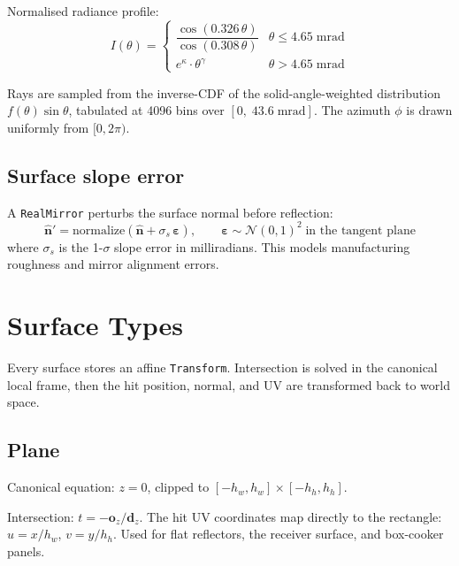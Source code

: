 \documentclass[12pt,a4paper]{report}
\begin{document}
Normalised radiance profile:
\begin{equation}
  I(\theta) = \begin{cases}
    \dfrac{\cos(0.326\,\theta)}{\cos(0.308\,\theta)} & \theta \leq 4.65\;\text{mrad} \\[8pt]
    e^\kappa \cdot \theta^\gamma & \theta > 4.65\;\text{mrad}
  \end{cases}
\end{equation}

Rays are sampled from the inverse-CDF of the solid-angle-weighted distribution
$f(\theta)\sin\theta$, tabulated at 4096 bins over $[0,\;43.6\;\text{mrad}]$.  The azimuth
$\phi$ is drawn uniformly from $[0, 2\pi)$.

\section{Surface slope error}

A \texttt{RealMirror} perturbs the surface normal before reflection:
\begin{equation}
  \hat{\mathbf{n}}' = \mathrm{normalize}\!\left(\hat{\mathbf{n}} + \sigma_s\,\boldsymbol{\varepsilon}\right),
  \qquad \boldsymbol{\varepsilon} \sim \mathcal{N}(0,1)^2 \;\text{in the tangent plane}
\end{equation}
where $\sigma_s$ is the 1-$\sigma$ slope error in milliradians.  This models manufacturing
roughness and mirror alignment errors.

\chapter{Surface Types}

Every surface stores an affine \texttt{Transform}.  Intersection is solved in the canonical
local frame, then the hit position, normal, and UV are transformed back to world space.

\section{Plane}

Canonical equation: $z = 0$, clipped to $[-h_w, h_w]\times[-h_h, h_h]$.

Intersection: $t = -\mathbf{o}_z / \mathbf{d}_z$.  The hit UV coordinates map directly to
the rectangle: $u = x/h_w$, $v = y/h_h$.  Used for flat reflectors, the receiver surface,
and box-cooker panels.
\end{document}
